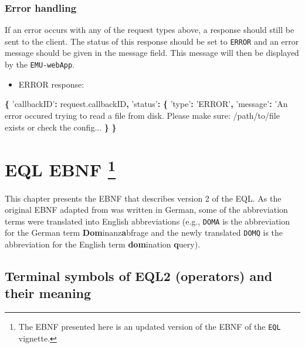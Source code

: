\documentclass[]{book}
\newenvironment{Shaded}{\begin{snugshade}}{\end{snugshade}}
\newcommand{\AttributeTok}[1]{\textcolor[rgb]{0.77,0.63,0.00}{#1}}
\newcommand{\NormalTok}[1]{#1}
\newcommand{\OperatorTok}[1]{\textcolor[rgb]{0.81,0.36,0.00}{\textbf{#1}}}
\newcommand{\StringTok}[1]{\textcolor[rgb]{0.31,0.60,0.02}{#1}}
\newcommand{\VariableTok}[1]{\textcolor[rgb]{0.00,0.00,0.00}{#1}}
\providecommand{\tightlist}{%
  \setlength{\itemsep}{0pt}\setlength{\parskip}{0pt}}
\let\rmarkdownfootnote\footnote%
\def\footnote{\protect\rmarkdownfootnote}
\begin{document}
\hypertarget{error-handling}{%
\subsection{Error handling}\label{error-handling}}

If an error occurs with any of the request types above, a response should still be sent to the client. The status of this response should be set to \texttt{ERROR} and an error message should be given in the message field. This message will then be displayed by the \texttt{EMU-webApp}.

\begin{itemize}
\tightlist
\item
  ERROR response:
\end{itemize}

\begin{Shaded}
\begin{Highlighting}[]
\OperatorTok{\{}
  \StringTok{'callbackID'}\OperatorTok{:} \VariableTok{request}\NormalTok{.}\AttributeTok{callbackID}\OperatorTok{,}
  \StringTok{'status'}\OperatorTok{:} \OperatorTok{\{}
    \StringTok{'type'}\OperatorTok{:} \StringTok{'ERROR'}\OperatorTok{,}
    \StringTok{'message'}\OperatorTok{:} \StringTok{'An error occured trying to read a file from disk. Please make sure: /path/to/file exists or check the config...}
  \OperatorTok{\}}
\OperatorTok{\}}
\end{Highlighting}
\end{Shaded}

\hypertarget{app-chap:EQL-EBNF}{%
\chapter[EQL EBNF ]{\texorpdfstring{EQL EBNF \footnote{The EBNF presented here is an updated version of the EBNF of the \texttt{EQL} vignette.}}{EQL EBNF }}\label{app-chap:EQL-EBNF}}

This chapter presents the EBNF \citep{garshol:2003a} that describes version 2 of the EQL. As the original EBNF adapted from \citet{john:2012a} was written in German, some of the abbreviation terms were translated into English abbreviations (e.g., \texttt{DOMA} is the abbreviation for the German term \textbf{Dom}inanz\textbf{a}bfrage and the newly translated \texttt{DOMQ} is the abbreviation for the English term \textbf{dom}ination \textbf{q}uery).

\hypertarget{terminal-symbols-of-eql2-operators-and-their-meaning}{%
\section{Terminal symbols of EQL2 (operators) and their meaning}\label{terminal-symbols-of-eql2-operators-and-their-meaning}}
\end{document}
